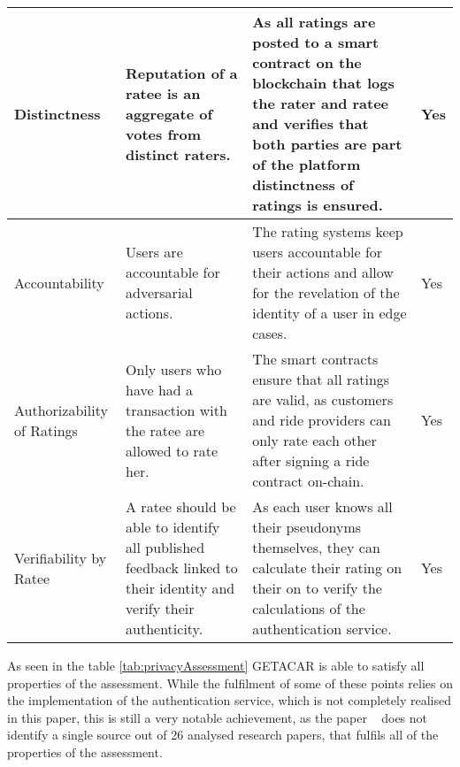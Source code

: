 \begin{longtable}{|p{3cm}|p{4.5cm}|p{5cm}|p{1.5cm}|}
\hline
Distinctness & Reputation of a ratee is an aggregate of votes from distinct raters. & As all ratings are posted to a smart contract on the blockchain that logs the rater and ratee and verifies that both parties are part of the platform distinctness of ratings is ensured. & Yes\\
\hline
Accountability & Users are accountable for adversarial actions. & The rating systems keep users accountable for their actions and allow for the revelation of the identity of a user in edge cases.& Yes\\
\hline
Authorizability of Ratings & Only users who have had a transaction with the ratee are allowed to rate her. & The smart contracts ensure that all ratings are valid, as customers and ride providers can only rate each other after signing a ride contract on-chain.& Yes\\
\hline
Verifiability by Ratee & A ratee should be able to identify all published feedback linked to their identity and verify their authenticity. &As each user knows all their pseudonyms themselves, they can calculate their rating on their on to verify the calculations of the authentication service.  & Yes\\
\hline
\end{longtable}

As seen in the table \ref{tab:privacyAssessment} GETACAR is able to satisfy all properties of the assessment. While the fulfilment of some of these points relies on the implementation of the authentication service, which is not completely realised in this paper, this is still a very notable achievement, as the paper ~\cite{HasanOmar} does not identify a single source out of 26 analysed research papers, that fulfils all of the properties of the assessment.  